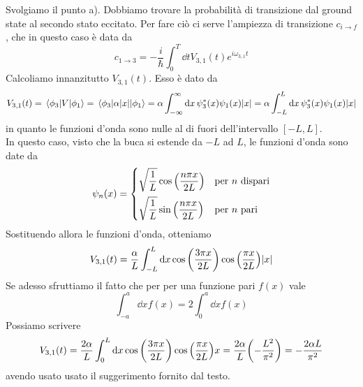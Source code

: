 \begin{soluzione}
   Svolgiamo il punto a). Dobbiamo trovare la probabilità di transizione dal ground state al secondo stato eccitato. Per fare ciò ci serve l'ampiezza di transizione $c_{i \to f}$, che in questo caso è data da
   \begin{equation*}
      c_{1 \to 3}
      =-\frac{i}{\hbar} \int_{0}^{T} \dd{t} V_{3,1}(t) e^{i \omega_{3,1} t}
   \end{equation*}
   Calcoliamo innanzitutto $V_{3,1}(t)$. Esso è dato da
   \begin{equation*}
      V_{3,1}(t)
      =\mel{\phi_3}{V}{\phi_1}
      =\mel{\phi_3}{\alpha |x|}{\phi_1}
      =\alpha \int_{-\infty}^{\infty} \dd{x} \psi_3^*(x) \psi_1(x) |x|
      =\alpha \int_{-L}^{L} \dd{x} \psi_3^*(x) \psi_1(x) |x|
   \end{equation*}
   in quanto le funzioni d'onda sono nulle al di fuori dell'intervallo $[-L,L]$.\\
   In questo caso, visto che la buca si estende da $-L$ ad $L$, le funzioni d'onda sono date da
   \begin{equation*}
      \psi_n(x)
      =
      \begin{cases}
         \displaystyle \sqrt{\frac{1}{L}}\cos{ \qty( \frac{n \pi x}{2L} ) } & \text{per $n$ dispari}\\[0.3cm]
         \displaystyle \sqrt{\frac{1}{L}}\sin{ \qty( \frac{n \pi x}{2L} ) } & \text{per $n$ pari}
      \end{cases}
   \end{equation*}
   Sostituendo allora le funzioni d'onda, otteniamo
   \begin{equation*}
      V_{3,1}(t)
      =\frac{\alpha}{L} \int_{-L}^{L} \dd{x} \cos{ \qty( \frac{3 \pi x}{2L} ) } \cos{ \qty( \frac{\pi x}{2L} ) } |x|
   \end{equation*}
   Se adesso sfruttiamo il fatto che per per una funzione pari $f(x)$ vale
   \begin{equation*}
      \int_{-a}^{a} \dd{x} f(x)
      =2 \int_{0}^{a} \dd{x} f(x)
   \end{equation*}
   Possiamo scrivere
   \begin{equation*}
      V_{3,1}(t)
      =\frac{2\alpha}{L} \int_{0}^{L} \dd{x} \cos{ \qty( \frac{3 \pi x}{2L} ) } \cos{ \qty( \frac{\pi x}{2L} ) } x
      =\frac{2\alpha}{L} \qty( -\frac{L^2}{\pi^2} )
      =-\frac{2\alpha L}{\pi^2}
   \end{equation*}
   avendo usato usato il suggerimento fornito dal testo.\\

\end{soluzione}
